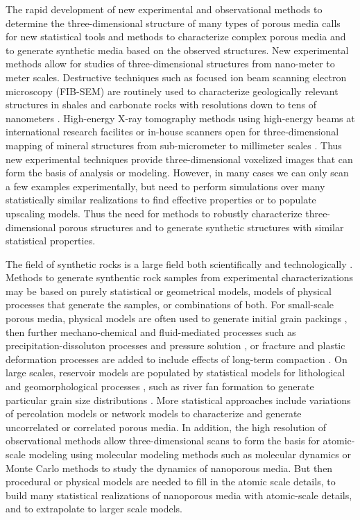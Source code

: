 \documentclass[aps,pre,twocolumn,letterpaper,floatfix,showpacs]{revtex4}
\begin{document}
The rapid development of new experimental and observational methods to determine the three-dimensional
structure of many types of porous media calls for new statistical tools and methods to characterize
complex porous media and to generate synthetic media based on the observed structures.
New experimental methods allow for studies of three-dimensional structures from nano-meter to meter scales.
Destructive techniques such as focused ion beam scanning electron microscopy (FIB-SEM) are routinely
used to characterize geologically relevant structures in shales and carbonate rocks with resolutions
down to tens of nanometers \cite{cnudde2013high,curtis2010structural}.
High-energy X-ray tomography methods using high-energy beams at international research facilites or
in-house scanners open for three-dimensional mapping of mineral structures from sub-micrometer to
millimeter scales \cite{kobchenko20114d,jamtveit2014pore,zhu2011microtomography,fusseis2009creep}.
Thus new experimental techniques provide three-dimensional voxelized images that can form the basis
of analysis or modeling.
However, in many cases we can only scan a few examples experimentally, but need to perform simulations
over many statistically similar realizations to find effective properties or to populate upscaling models.
Thus the need for methods to robustly characterize three-dimensional porous structures and to generate
synthetic structures with similar statistical properties. 

The field of synthetic rocks is a large field both scientifically and technologically \citep{biswal2007stochastic,hamzehpour2006development, yeong1998reconstructing}. 
Methods to generate synthentic rock samples from experimental characterizations may be based on 
purely statistical or geometrical models, models of physical processes that generate the samples, or combinations of both. 
For small-scale porous media, physical models are often used to generate initial grain
packings \cite{pilotti1998generation,scott1969density,herrmann2013physics}, then further mechano-chemical
and fluid-mediated processes such as precipitation-dissoluton processes and pressure
solution \cite{rutter1983pressure}, or fracture and plastic deformation processes are added
to include effects of long-term compaction \cite{rutter1983pressure,renard1997pressure}. 
On large scales, reservoir models are populated by statistical models for lithological and
geomorphological processes \cite{pyrcz2014geostatistical}, such as river fan formation to
generate particular grain size distributions \cite{koltermann1996heterogeneity,blair1994alluvial}. 
More statistical approaches include variations of percolation models \cite{sahimi} or
network models \cite{fatt1956network,sahimi1993flow} to characterize and generate uncorrelated or correlated porous media. 
In addition, the high resolution of observational methods allow three-dimensional scans to
form the basis for atomic-scale modeling using molecular modeling methods such as
molecular dynamics or Monte Carlo methods to study the dynamics of nanoporous media. 
But then procedural or physical models are needed to fill in the atomic scale details, to
build many statistical realizations of nanoporous media with atomic-scale details, and to extrapolate to larger scale models.
\end{document}
